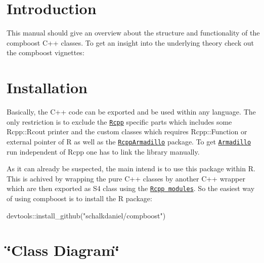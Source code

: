 \hypertarget{index_intro_sec}{}\section{Introduction}\label{index_intro_sec}
This manual should give an overview about the structure and functionality of the {\ttfamily compboost} {\ttfamily C++} classes. To get an insight into the underlying theory check out the {\ttfamily compboost} vignettes\+:\hypertarget{index_install_sec}{}\section{Installation}\label{index_install_sec}
Basically, the {\ttfamily C++} code can be exported and be used within any language. The only restriction is to exclude the \href{https://cran.r-project.org/web/packages/Rcpp/vignettes/Rcpp-introduction.pdf}{\tt {\ttfamily Rcpp}} specific parts which includes some {\ttfamily Rcpp\+::\+Rcout} printer and the custom classes which requires {\ttfamily Rcpp\+::\+Function} or external pointer of {\ttfamily R} as well as the \href{https://cran.r-project.org/web/packages/RcppArmadillo/vignettes/RcppArmadillo-intro.pdf}{\tt {\ttfamily Rcpp\+Armadillo}} package. To get \href{http://arma.sourceforge.net}{\tt {\ttfamily Armadillo}} run independent of {\ttfamily Rcpp} one has to link the library manually.

As it can already be suspected, the main intend is to use this package within {\ttfamily R}. This is achived by wrapping the pure {\ttfamily C++} classes by another {\ttfamily C++} wrapper which are then exported as {\ttfamily S4} class using the \href{https://cran.r-project.org/web/packages/Rcpp/vignettes/Rcpp-modules.pdf}{\tt Rcpp modules}. So the easiest way of using {\ttfamily compboost} is to install the {\ttfamily R} package\+:


\begin{DoxyCode}
devtools::install\_github(\textcolor{stringliteral}{"schalkdaniel/compboost"})
\end{DoxyCode}
\hypertarget{index_class_diagram}{}\section{\char`\"{}\+Class Diagram\char`\"{}}\label{index_class_diagram}
 